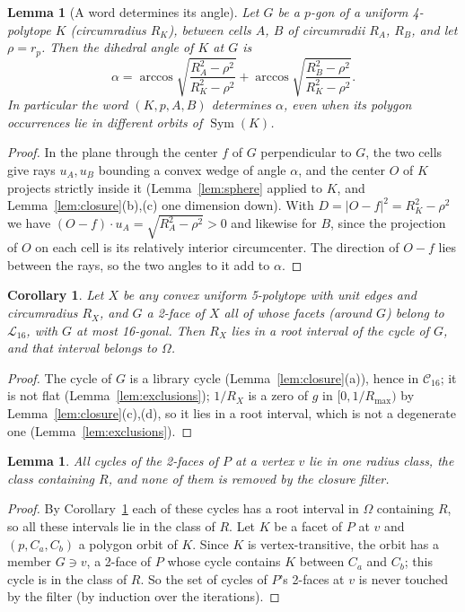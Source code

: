 \documentclass[11pt]{article}
\newtheorem{lemma}[theorem]{Lemma}
\newtheorem{corollary}[theorem]{Corollary}
\theoremstyle{definition}
\theoremstyle{remark}
\newcommand{\Sym}{\operatorname{Sym}}
\begin{document}
\begin{appendices}
\label{sec:facetdata}
\begin{lemma}[A word determines its angle]\label{lem:wordangle}
Let $G$ be a $p$-gon of a uniform 4-polytope $K$ (circumradius $R_K$),
between cells $A$, $B$ of circumradii $R_A$, $R_B$, and let $\rho=r_p$.
Then the dihedral angle of $K$ at $G$ is
\[
\alpha=\arccos\sqrt{\frac{R_A^2-\rho^2}{R_K^2-\rho^2}}
      +\arccos\sqrt{\frac{R_B^2-\rho^2}{R_K^2-\rho^2}} .
\]
In particular the word $(K,p,A,B)$ determines $\alpha$, even when its
polygon occurrences lie in different orbits of $\Sym(K)$.
\end{lemma}
\begin{proof}
In the plane through the center $f$ of $G$ perpendicular to $G$, the two
cells give rays $u_A,u_B$ bounding a convex wedge of angle $\alpha$, and
the center $O$ of $K$ projects strictly inside it (Lemma~\ref{lem:sphere}
applied to $K$, and Lemma~\ref{lem:closure}(b),(c) one dimension down).
With $D=|O-f|^2=R_K^2-\rho^2$ we have $(O-f)\cdot u_A=\sqrt{R_A^2-\rho^2}>0$
and likewise for $B$, since the projection of $O$ on each cell is its
relatively interior circumcenter. The direction of $O-f$ lies between the
rays, so the two angles to it add to $\alpha$.
\end{proof}


\begin{corollary}\label{cor:omega}
Let $X$ be any convex uniform 5-polytope with unit edges and circumradius
$R_X$, and $G$ a 2-face of $X$ all of whose facets (around $G$) belong to
$\mathcal L_{16}$, with $G$ at most 16-gonal. Then $R_X$ lies in a root
interval of the cycle of $G$, and that interval belongs to $\Omega$.
\end{corollary}
\begin{proof}
The cycle of $G$ is a library cycle (Lemma~\ref{lem:closure}(a)), hence
in $\mathcal C_{16}$; it is not flat (Lemma~\ref{lem:exclusions});
$1/R_X$ is a zero of $g$ in $[0,1/R_{\max})$ by
Lemma~\ref{lem:closure}(c),(d), so it lies in a root interval, which is not
a degenerate one (Lemma~\ref{lem:exclusions}).
\end{proof}


\begin{lemma}\label{lem:filter}
All cycles of the 2-faces of $P$ at a vertex $v$ lie in one radius class,
the class containing $R$, and none of them is removed by the closure
filter.
\end{lemma}
\begin{proof}
By Corollary~\ref{cor:omega} each of these cycles has a root interval in
$\Omega$ containing $R$, so all these intervals lie in the class of $R$.
Let $K$ be a facet of $P$ at $v$ and $(p,C_a,C_b)$ a polygon orbit of $K$.
Since $K$ is vertex-transitive, the orbit has a member $G\ni v$, a 2-face
of $P$ whose cycle contains $K$ between $C_a$ and $C_b$; this cycle is in
the class of $R$. So the set of cycles of $P$'s 2-faces at $v$ is never
touched by the filter (by induction over the iterations).
\end{proof}


\end{appendices}
\end{document}

